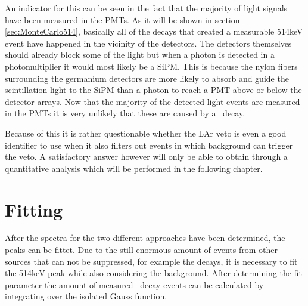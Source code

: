 \documentclass[encoding=utf8,british]{tumphthesis}
\begin{document}
An indicator for this can be seen in the fact that the majority of light signals have been measured in the PMTs.
As it will be shown in section \ref{sec:MonteCarlo514}, basically all of the decays that created a measurable 514keV event have happened in the vicinity of the detectors.
The detectors themselves should already block some of the light but when a photon is detected in a photomultiplier it would most likely be a SiPM.
This is because the nylon fibers surrounding the germanium detectors are more likely to absorb and guide the scintillation light to the SiPM than a photon to reach a PMT above or below the detector arrays.
Now that the majority of the detected light events are measured in the PMTs it is very unlikely that these are caused by a \Kr\ decay.

Because of this it is rather questionable whether the LAr veto is even a good identifier to use when it also filters out events in which background can trigger the veto.
A satisfactory answer however will only be able to obtain through a quantitative analysis which will be performed in the following chapter.
\\

\section{Fitting}
\label{sec:Fitting}

After the spectra for the two different approaches have been determined, the peaks can be fittet.
Due to the still enormous amount of events from other sources that can not be suppressed, for example the  decays, it is necessary to fit the 514keV peak while also considering the background.
After determining the fit parameter the amount of measured \Kr\ decay events can be calculated by integrating over the isolated Gauss function.
\\
\end{document}
